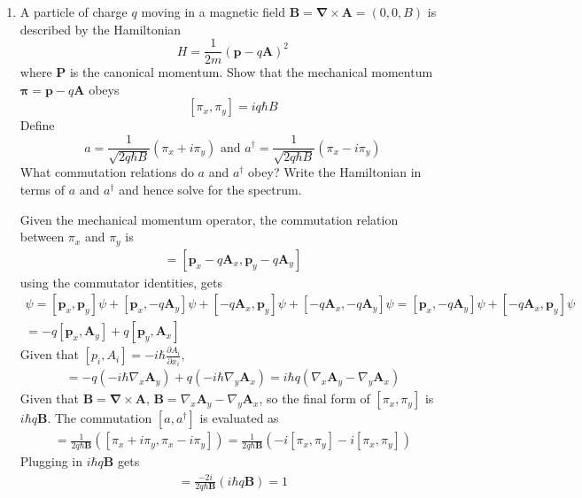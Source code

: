 \documentclass[10pt,letterpaper]{article}
\begin{document}
\begin{enumerate}
\item A particle of charge $q$ moving in a magnetic field $\textbf{B} = \boldsymbol{\nabla} \times \textbf{A} = (0, 0, B)$ is described by the Hamiltonian
$$H = \frac{1}{2m}(\textbf{p} - q\textbf{A})^{2}$$
where $\textbf{P}$ is the canonical momentum. Show that the mechanical momentum $\boldsymbol{\pi} = \textbf{p} - q\textbf{A}$ obeys
$$[\pi_{x}, \pi_{y}] = iq\hbar B$$
Define
$$a = \frac{1}{\sqrt{2q\hbar B}}(\pi_{x} + i\pi_{y}) \text{  and  } a^{\dagger} = \frac{1}{\sqrt{2q\hbar B}}(\pi_{x} - i\pi_{y})$$
What commutation relations do $a$ and $a^{\dagger}$ obey? Write the Hamiltonian in terms of $a$ and $a^{\dagger}$ and hence solve for the spectrum.

\color{violet}
Given the mechanical momentum operator, the commutation relation between $\pi_{x}$ and $\pi_{y}$ is
\begin{gather*}
[\pi_{x}, \pi_{y}] = [\textbf{p}_{x} - q\textbf{A}_{x}, \textbf{p}_{y} - q\textbf{A}_{y}]
\end{gather*}
using the commutator identities, gets
\begin{gather*}
[\pi_{x}, \pi_{y}]\psi = [\textbf{p}_{x}, \textbf{p}_{y}]\psi + [\textbf{p}_{x}, -q\textbf{A}_{y}]\psi + [-q\textbf{A}_{x}, \textbf{p}_{y}]\psi + [-q\textbf{A}_{x}, -q\textbf{A}_{y}]\psi = [\textbf{p}_{x}, -q\textbf{A}_{y}]\psi + [-q\textbf{A}_{x}, \textbf{p}_{y}]\psi \\
= -q[\textbf{p}_{x}, \textbf{A}_{y}] + q[\textbf{p}_{y}, \textbf{A}_{x}]
\end{gather*}
Given that $[p_{i}, A_{i}] = -i\hbar\frac{\partial A_{i}}{\partial x_{i}}$,
\begin{gather*}
[\pi_{x}, \pi_{y}] = -q(-i\hbar\nabla_{x}\textbf{A}_{y}) + q(-i\hbar\nabla_{y}\textbf{A}_{x}) = i\hbar q(\nabla_{x}\textbf{A}_{y} - \nabla_{y}\textbf{A}_{x})
\end{gather*}
Given that $\textbf{B} = \boldsymbol{\nabla} \times \textbf{A}$, $\textbf{B} = \nabla_{x}\textbf{A}_{y} - \nabla_{y}\textbf{A}_{x}$, so the final form of $[\pi_{x}, \pi_{y}]$ is $i\hbar q\textbf{B}$. The commutation $[a, a^{\dagger}]$ is evaluated as
\begin{gather*}
[a, a^{\dagger}] = \frac{1}{2q\hbar\textbf{B}}([\pi_{x} + i\pi_{y}, \pi_{x} - i\pi_{y}]) = \frac{1}{2q\hbar\textbf{B}}(-i[\pi_{x}, \pi_{y}] - i[\pi_{x}, \pi_{y}])
\end{gather*}
Plugging in $i\hbar q\textbf{B}$ gets
\begin{gather*}
[a, a^{\dagger}] = \frac{-2i}{2q\hbar\textbf{B}}(i\hbar q\textbf{B}) = 1

\end{gather*}
\end{enumerate}
\end{document}
